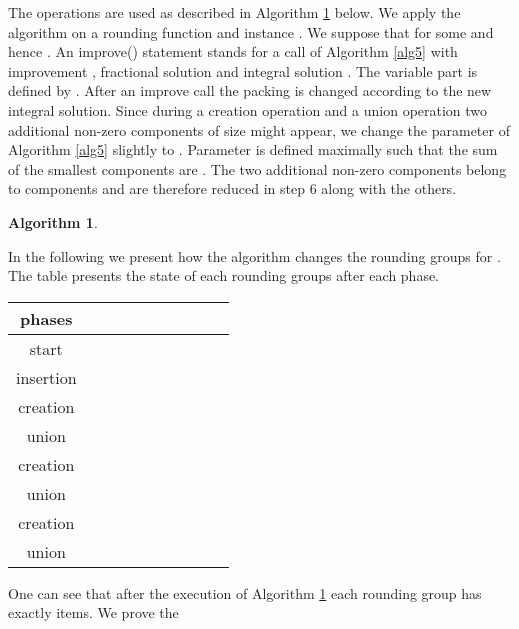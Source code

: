 \documentclass[a4paper,11pt]{article}
\newtheorem{algo}{Algorithm}
\begin{document}
The operations are used as described in Algorithm \ref{alg7} below. We apply the algorithm on a rounding function
 and instance . We suppose that 
for some  and hence .
An improve() statement stands for a call of Algorithm \ref{alg5} 
with improvement , fractional solution  and integral solution . The variable part  
is defined by . 
After an improve call the packing is changed according to the new integral solution.
Since during a creation operation and a union operation two additional non-zero components of size  might appear,
we change the parameter  of Algorithm \ref{alg5} slightly to . Parameter  is defined maximally such that
the sum of the smallest components  are 
. The two additional non-zero components belong to
components  and are therefore reduced in step 6 along with the others.
\begin{algo}\label{alg7}
\\
 \begin{algorithm}[H]
  \end{algorithm}
\end{algo}
In the following we present how the algorithm changes the rounding groups for . The table presents the state of each
rounding
groups after each phase.
\begin{table}\centering
\begin{tabular}{c|c|c|c|c|c|c|c|c|c}
phases &  &  &  &  &  &  &  &  & \\
\hline
start &  &  &  &  &  &  &  &  &  \\
insertion &  &  &  &  &  &  &  &  &  \\
creation &  &  &  &  &  &  &  &  & \\
union &  &  &  &  &  &  &  &  &  \\
creation &  &  &  &  &  &  &  &  &  \\
union &  &  &  &  &  &  &  &  &  \\
creation &  &  &  &  &  &  &  &  &  \\
union &  &  &  &  &  &  &  &  &  \\
\end{tabular}
\end{table}
One can see that after the execution of Algorithm \ref{alg7} each rounding group has exactly  items. We prove the
\end{document}
